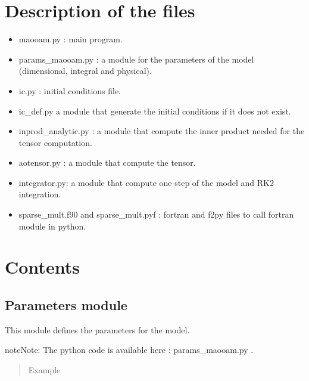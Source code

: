 \documentclass[letterpaper,10pt,english]{sphinxmanual}
\begin{document}
\chapter{Description of the files}
\label{index:description-of-the-files}\begin{itemize}
\item {} 
maooam.py : main program.

\item {} 
params\_maooam.py : a module for the parameters of the model (dimensional, integral and physical).

\item {} 
ic.py : initial conditions file.

\item {} 
ic\_def.py a module that generate the initial conditions if it does not exist.

\item {} 
inprod\_analytic.py : a module that compute the inner product needed for the tensor computation.

\item {} 
aotensor.py : a module that compute the tensor.

\item {} 
integrator.py: a module that compute one step of the model and RK2 integration.

\item {} 
sparse\_mult.f90 and sparse\_mult.pyf : fortran and f2py files to call fortran module in python.

\end{itemize}


\chapter{Contents}
\label{index:contents}\label{rstfiles/params_maooam:module-params_maooam}

\section{Parameters module}
\label{rstfiles/params_maooam:parameters-module}\label{rstfiles/params_maooam::doc}
This module defines the parameters for the model.

\begin{notice}{note}{Note:}
The python code is available here :     params\_maooam.py .
\end{notice}
\begin{quote}\begin{description}
\item[{Example}] \leavevmode
\end{description}\end{quote}
\end{document}
